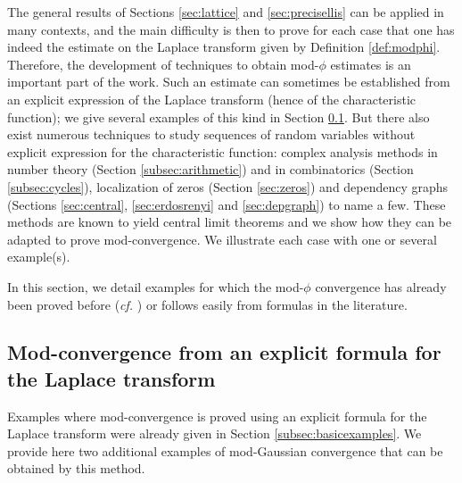 \documentclass[12pt,a4paper,reqno]{amsart}
\theoremstyle{remark}
\renewcommand{\footnote}[1]{}
\begin{document}
The general results of Sections \ref{sec:lattice} and \ref{sec:precisellis} can be applied in many contexts, and the main difficulty is then to prove for each case that one has indeed the estimate on the Laplace transform given by Definition \ref{def:modphi}. Therefore, the development of techniques to obtain mod-$\phi$ estimates is an important part of the work. Such an estimate can sometimes be established from an explicit expression of the Laplace transform (hence of the characteristic function); we give several examples of this kind in Section \ref{subsec:explicit}. But there also exist numerous techniques to study sequences of random variables without explicit expression for the characteristic function: complex analysis methods in number theory (Section \ref{subsec:arithmetic}) and in combinatorics (Section \ref{subsec:cycles}), localization of zeros (Section \ref{sec:zeros}) and dependency graphs (Sections \ref{sec:central}, \ref{sec:erdosrenyi} and \ref{sec:depgraph}) to name a few. These methods are known to yield central limit theorems and we show how they can be adapted to prove mod-convergence. We illustrate each case with one or several example(s).
\footnote{V: Le paragraphe ci-dessus serait bien dans l'introduction peut-être\ldots}
\bigskip

In this section, we detail examples for which the mod-$\phi$ convergence has already been proved before (\emph{cf.} \cite{JKN11,DKN11}) or follows easily from formulas in the literature.\bigskip



\subsection{Mod-convergence from an explicit formula for the Laplace transform}
\label{subsec:explicit}
Examples where mod-convergence is proved using an explicit formula for the Laplace transform were already given in Section \ref{subsec:basicexamples}. We provide here two additional examples of mod-Gaussian convergence that can be obtained by this method.
\end{document}
